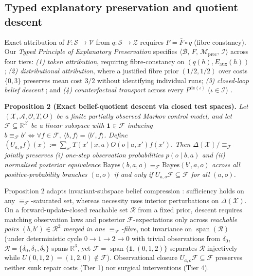\documentclass[12pt,letterpaper]{article}
\begin{document}
\subsection{Typed explanatory preservation and quotient
descent}\label{typed-explanatory-preservation-and-quotient-descent}

Exact attribution of \(F: \mathcal{S} \to \mathcal{V}\) from
\(q: \mathcal{S} \to \mathcal{Z}\) requires \(F = \bar{F} \circ q\)
(fibre-constancy). Our \emph{Typed Principle of Explanatory
Preservation} specifies
\(\langle \mathcal{B},\, F,\, \mathcal{M}_{\mathrm{prec}},\, \mathcal{I}\rangle\)
across four tiers: \emph{(1) token attribution}, requiring
fibre-constancy on \((q(h), E_{\mathrm{aux}}(h))\); \emph{(2)
distributional attribution}, where a justified fibre prior
\((1/2, 1/2)\) over costs \(\{0,3\}\) preserves mean cost \(3/2\)
without identifying individual runs; \emph{(3) closed-loop belief
descent}
\citep{burkeRosenblatt1958, kemenySnell1960, poupartBoutilier2003, givanDeanGreig2003};
and \emph{(4) counterfactual transport} across every
\(P^{\mathrm{do}(\iota)}\) (\(\iota \in \mathcal{I}\))
\citep{woodward2000, rubenstein2017}.

\textbf{Proposition 2 (Exact belief-quotient descent via closed test
spaces).} \emph{Let \((\mathcal{X}, \mathcal{A}, \mathcal{O}, T, O)\) be
a finite partially observed Markov control model, and let
\(\mathcal{F} \subseteq \mathbb{R}^{\mathcal{X}}\) be a linear subspace
with \(\mathbf{1} \in \mathcal{F}\) inducing
\(b \equiv_{\mathcal{F}} b' \iff \forall f \in \mathcal{F},\ \langle b, f\rangle = \langle b', f\rangle\).
Define
\((U_{a,o} f)(x) := \sum_{x'} T(x' \mid x, a) O(o \mid a, x') f(x')\).
Then \(\Delta(\mathcal{X})/{\equiv_{\mathcal{F}}}\) jointly preserves
(i) one-step observation probabilities \(p(o \mid b, a)\) and (ii)
normalised posterior equivalence
\(\mathrm{Bayes}(b,a,o) \equiv_{\mathcal{F}} \mathrm{Bayes}(b',a,o)\)
across all positive-probability branches \((a,o)\) if and only if
\(U_{a,o}\mathcal{F} \subseteq \mathcal{F}\) for all \((a,o)\).}

Proposition 2 adapts invariant-subspace belief compression
\citep{poupartBoutilier2003}: sufficiency holds on any
\(\equiv_{\mathcal{F}}\)-saturated set, whereas necessity uses interior
perturbations on \(\Delta(\mathcal{X})\). On a forward-update-closed
reachable set \(\mathcal{R}\) from a fixed prior, descent requires
matching observation laws and posterior \(\mathcal{F}\)-expectations
only across \emph{reachable pairs \((b,b') \in \mathcal{R}^2\) merged in
one \(\equiv_{\mathcal{F}}\)-fibre}, not invariance on
\(\operatorname{span}(\mathcal{R})\) (under deterministic cycle
\(0 \to 1 \to 2 \to 0\) with trivial observations from \(\delta_0\),
\(\mathcal{R} = \{\delta_0,\delta_1,\delta_2\}\) spans \(\mathbb{R}^3\),
yet \(\mathcal{F} = \operatorname{span}\{\mathbf{1}, (0,1,2)\}\)
separates \(\mathcal{R}\) injectively while
\(U(0,1,2) = (1,2,0) \notin \mathcal{F}\)). Observational closure
\(U_{a,o}\mathcal{F} \subseteq \mathcal{F}\) preserves neither sunk
repair costs (Tier 1) nor surgical interventions (Tier 4).
\end{document}
